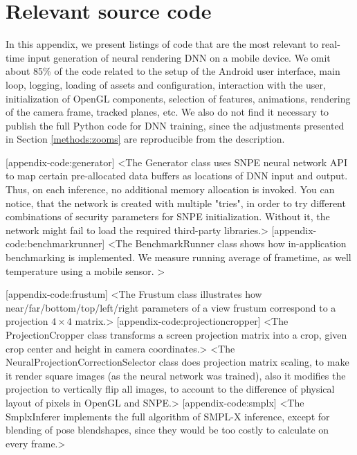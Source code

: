 \chapter{Relevant source code}
\label{appendix-code}

In this appendix, we present listings of code that are the most relevant to real-time input generation of neural rendering DNN on a mobile device. We omit about 85\% of the code related to the setup of the Android user interface, main loop, logging, loading of assets and configuration, interaction with the user, initialization of OpenGL components, selection of features, animations, rendering of the camera frame, tracked planes, etc. We also do not find it necessary to publish the full Python code for DNN training, since the adjustments presented in Section \ref{methods:zooms} are reproducible from the description.

[appendix-code:generator]
<The Generator class uses SNPE neural network API to map certain pre-allocated data buffers as locations of DNN input and output. Thus, on each inference, no additional memory allocation is invoked. You can notice, that the network is created with multiple "tries", in order to try different combinations of security parameters for SNPE initialization. Without it, the network might fail to load the required third-party libraries.>
[appendix-code:benchmarkrunner]
<The BenchmarkRunner class shows how in-application benchmarking is implemented. We measure running average of frametime, as well temperature using a mobile sensor. >


[appendix-code:frustum]
<The Frustum class illustrates how near/far/bottom/top/left/right parameters of a view frustum correspond to a projection $4\times4$ matrix.>
[appendix-code:projectioncropper]
<The ProjectionCropper class transforms a screen projection matrix into a crop, given crop center and height in camera coordinates.>
<The NeuralProjectionCorrectionSelector class does projection matrix scaling, to make it render square images (as the neural network was trained), also it modifies the projection to vertically flip all images, to account to the difference of physical layout of pixels in OpenGL and SNPE.>
[appendix-code:smplx]
<The SmplxInferer implements the full algorithm of SMPL-X inference, except for blending of pose blendshapes, since they would be too costly to calculate on every frame.>

